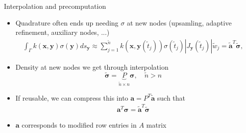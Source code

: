 \documentclass[t]{beamer}
\newcommand{\mbf}[1]{{\bm #1}}           %
\newcommand{\xx}{\mbf{x}}
\newcommand{\yy}{\mbf{y}}
\begin{document}
\begin{frame}{Interpolation and precomputation}
  \begin{itemize}
  \item Quadrature often ends up needing $\sigma$ at new nodes (upsamling, adaptive refinement, auxiliary nodes, ...)
      \begin{align}
        \int_\Gamma k(\xx, \yy) \sigma(\yy) ds_\yy
        \approx
        \sum_{j=1}^{\tilde n} k\left(\xx, \yy(\tilde t_j)\right) \sigma(\tilde t_j) |J_\yy(\tilde t_j)| \tilde w_j = \bm{\tilde a}^T\bm{\tilde\sigma}, 
      \end{align}
      \pause
    \item Density at new nodes we get through interpolation
      $$\bm{\tilde\sigma} = \underbrace{P}_{\tilde n \times n}\bm{\sigma}, \quad \tilde n > n$$
      \pause
    \item If reusable, we can compress this into $\bm{a} = P^T\bm{\tilde a}$ such that
      \begin{align}
        \bm{a}^T\bm{\sigma} = \bm{\tilde a}^T\bm{\tilde\sigma}
      \end{align}
    \item $\bm{a}$ corresponds to modified row entries in $A$ matrix
  \end{itemize}
\end{frame}
\end{document}
